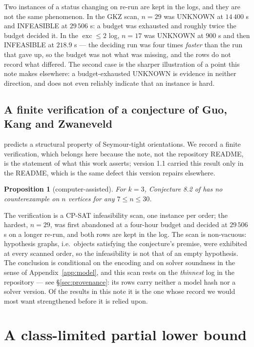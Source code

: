 \documentclass[11pt]{amsart}
\newtheorem{proposition}[theorem]{Proposition}
\theoremstyle{remark}
\newcommand{\exc}{\operatorname{exc}}
\begin{document}
Two instances of a status changing on re-run are kept in the logs, and they
are not the same phenomenon. In the GKZ scan, $n = 29$ was UNKNOWN at
$14\,400$ s and INFEASIBLE at $29\,506$ s: a budget was exhausted and roughly
twice the budget decided it. In the $\exc \le 2$ log, $n = 17$ was UNKNOWN at
$900$ s and then INFEASIBLE at $218.9$ s --- the deciding run was four times
\emph{faster} than the run that gave up, so the budget was not what was
missing, and the rows do not record what differed. The second case is the
sharper illustration of a point this note makes elsewhere: a budget-exhausted
UNKNOWN is evidence in neither direction, and does not even reliably indicate
that an instance is hard.

\subsection{A finite verification of a conjecture of Guo, Kang and
Zwaneveld}\label{sec:gkz}

\cite[Conj.~8.2]{GuoKangZwaneveld2026} predicts a structural property of
Seymour-tight orientations. We record a finite verification, which belongs
here because the note, not the repository README, is the statement of what
this work asserts; version 1.1 carried this result only in the README, which
is the same defect this version repairs elsewhere.

\begin{proposition}[computer-assisted]\label{prop:gkz}
For $k = 3$, Conjecture 8.2 of \cite{GuoKangZwaneveld2026} has no
counterexample on $n$ vertices for any $7 \le n \le 30$.
\end{proposition}

The verification is a CP-SAT infeasibility scan, one instance per order; the
hardest, $n = 29$, was first abandoned at a four-hour budget and decided at
$29\,506$ s on a longer re-run, and both rows are kept in the log. The scan is
non-vacuous: hypothesis graphs, i.e.\ objects satisfying the conjecture's
premise, were exhibited at every scanned order, so the infeasibility is not
that of an empty hypothesis. The conclusion is conditional on the encoding and
on solver soundness in the sense of Appendix~\ref{app:model}, and this scan
rests on the \emph{thinnest} log in the repository --- see
\S\ref{sec:provenance}: its rows carry neither a model hash nor a solver
version. Of the results in this note it is the one whose record we would most
want strengthened before it is relied upon.

\section{A class-limited partial lower bound}\label{sec:class}
\end{document}
